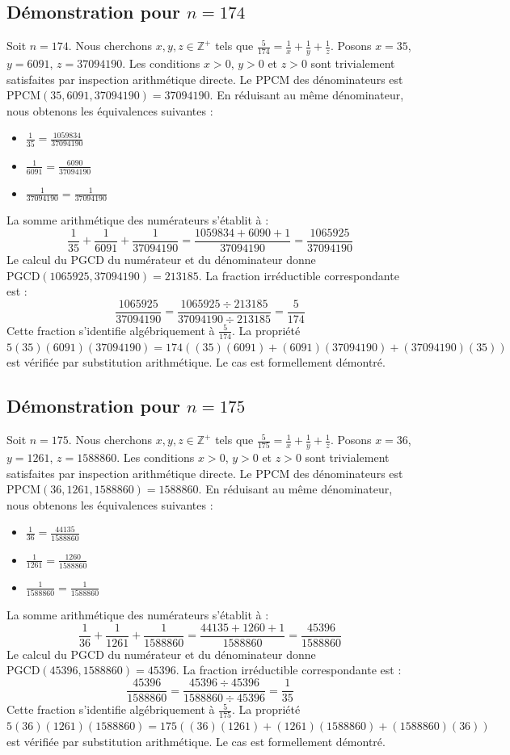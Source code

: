 \documentclass[12pt,a4paper]{article}
\begin{document}
\subsection{Démonstration pour $n = 174$}
Soit $n = 174$. Nous cherchons $x, y, z \in \mathbb{Z}^{+}$ tels que $\frac{5}{174} = \frac{1}{x} + \frac{1}{y} + \frac{1}{z}$.
Posons $x = 35$, $y = 6091$, $z = 37094190$.
Les conditions $x > 0$, $y > 0$ et $z > 0$ sont trivialement satisfaites par inspection arithmétique directe.
Le PPCM des dénominateurs est $\text{PPCM}(35, 6091, 37094190) = 37094190$.
En réduisant au même dénominateur, nous obtenons les équivalences suivantes :
\begin{itemize}
    \item $\frac{1}{35} = \frac{1059834}{37094190}$
    \item $\frac{1}{6091} = \frac{6090}{37094190}$
    \item $\frac{1}{37094190} = \frac{1}{37094190}$
\end{itemize}
La somme arithmétique des numérateurs s'établit à :
$$ \frac{1}{35} + \frac{1}{6091} + \frac{1}{37094190} = \frac{1059834 + 6090 + 1}{37094190} = \frac{1065925}{37094190} $$
Le calcul du PGCD du numérateur et du dénominateur donne $\text{PGCD}(1065925, 37094190) = 213185$.
La fraction irréductible correspondante est :
$$ \frac{1065925}{37094190} = \frac{1065925 \div 213185}{37094190 \div 213185} = \frac{5}{174} $$
Cette fraction s'identifie algébriquement à $\frac{5}{174}$.
La propriété $5(35)(6091)(37094190) = 174((35)(6091) + (6091)(37094190) + (37094190)(35))$ est vérifiée par substitution arithmétique.
Le cas est formellement démontré.

\subsection{Démonstration pour $n = 175$}
Soit $n = 175$. Nous cherchons $x, y, z \in \mathbb{Z}^{+}$ tels que $\frac{5}{175} = \frac{1}{x} + \frac{1}{y} + \frac{1}{z}$.
Posons $x = 36$, $y = 1261$, $z = 1588860$.
Les conditions $x > 0$, $y > 0$ et $z > 0$ sont trivialement satisfaites par inspection arithmétique directe.
Le PPCM des dénominateurs est $\text{PPCM}(36, 1261, 1588860) = 1588860$.
En réduisant au même dénominateur, nous obtenons les équivalences suivantes :
\begin{itemize}
    \item $\frac{1}{36} = \frac{44135}{1588860}$
    \item $\frac{1}{1261} = \frac{1260}{1588860}$
    \item $\frac{1}{1588860} = \frac{1}{1588860}$
\end{itemize}
La somme arithmétique des numérateurs s'établit à :
$$ \frac{1}{36} + \frac{1}{1261} + \frac{1}{1588860} = \frac{44135 + 1260 + 1}{1588860} = \frac{45396}{1588860} $$
Le calcul du PGCD du numérateur et du dénominateur donne $\text{PGCD}(45396, 1588860) = 45396$.
La fraction irréductible correspondante est :
$$ \frac{45396}{1588860} = \frac{45396 \div 45396}{1588860 \div 45396} = \frac{1}{35} $$
Cette fraction s'identifie algébriquement à $\frac{5}{175}$.
La propriété $5(36)(1261)(1588860) = 175((36)(1261) + (1261)(1588860) + (1588860)(36))$ est vérifiée par substitution arithmétique.
Le cas est formellement démontré.
\end{document}
